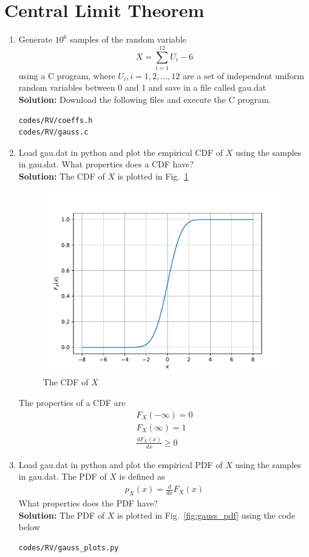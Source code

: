 \documentclass[journal,8pt,onecolumn]{IEEEtran}
\newcommand\figref{Fig.~\ref}
\newcommand{\solution}{\noindent \textbf{Solution: }}
\begin{document}
\section{Central Limit Theorem}
\begin{enumerate}
%
%
\item
Generate $10^6$ samples of the random variable
%
\begin{equation}
X = \sum_{i=1}^{12}U_i -6
\end{equation}
%
using a C program, where $U_i, i = 1,2,\dots, 12$ are  a set of independent uniform random variables between 0 and 1
and save in a file called gau.dat\\
\solution Download the following files and execute the  C program.
\begin{lstlisting}
codes/RV/coeffs.h
codes/RV/gauss.c
\end{lstlisting}
%
\item
Load gau.dat in python and plot the empirical CDF of $X$ using the samples in gau.dat. What properties does a CDF have?
\\
\solution The CDF of $X$ is plotted in \figref{fig:gauss_cdf}
\begin{figure}[H]
\centering
\includegraphics[width=\columnwidth/2]{./figs/gau_cdf.pdf}
\caption{The CDF of $X$}
\label{fig:gauss_cdf}
\end{figure}
The properties of a CDF are
\begin{eqnarray}
	F_X(-\infty) = 0\\
	F_X(\infty) = 1\\
	\frac{dF_X(x)}{dx} \ge 0
\end{eqnarray}
\item
Load gau.dat in python and plot the empirical PDF of $X$ using the samples in gau.dat. The PDF of $X$ is defined as
\begin{align}
p_{X}(x) = \frac{d}{dx}F_{X}(x)
\label{eq:cdf_to_pdf}
\end{align}
What properties does the PDF have?
\\
\solution The PDF of $X$ is plotted in \figref{fig:gauss_pdf} using the code below
\begin{lstlisting}
codes/RV/gauss_plots.py
\end{lstlisting}


\end{enumerate}
\end{document}
